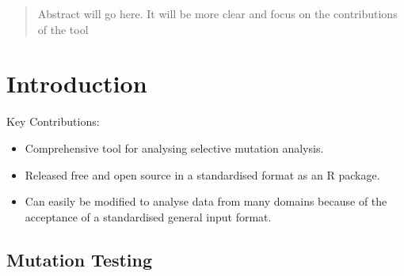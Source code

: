 \documentclass[conference]{IEEEtran}
\begin{document}

\maketitle

\begin{abstract}
    Abstract will go here. It will be more clear and focus on the contributions of the tool
\end{abstract}

%
\IEEEpeerreviewmaketitle

\section{Introduction}
    Key Contributions:
    \begin{itemize}
        \item Comprehensive tool for analysing selective mutation analysis.
        \item Released free and open source in a standardised format as an R package.
        \item Can easily be modified to analyse data from many domains because of the acceptance of a standardised general input format.
    \end{itemize}

\subsection{Mutation Testing}
\end{document}
